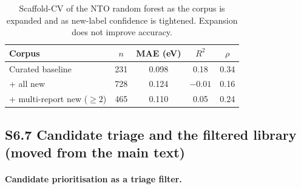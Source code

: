 \documentclass[final,3p,times,twocolumn]{elsarticle}
\begin{document}
\begin{table}[htbp]
  \centering
  \caption{Scaffold-CV of the NTO random forest as the corpus is expanded and as
    new-label confidence is tightened. Expansion does not improve accuracy.}
  \label{tab:expansion}
  \footnotesize
  \begin{tabular}{lcccc}
    \toprule
    Corpus & $n$ & MAE (eV) & $R^2$ & $\rho$ \\
    \midrule
    Curated baseline            & 231 & 0.098 & \phantom{$-$}0.18 & 0.34 \\
    + all new                   & 728 & 0.124 & $-0.01$           & 0.16 \\
    + multi-report new ($\ge 2$) & 465 & 0.110 & \phantom{$-$}0.05 & 0.24 \\
    \bottomrule
  \end{tabular}
\end{table}

\subsection*{S6.7 Candidate triage and the filtered library (moved from the main text)}\label{subsec:triage_library}
\paragraph{Candidate prioritisation as a triage filter.}
\end{document}

